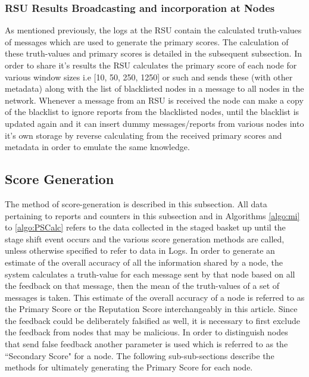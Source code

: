 \documentclass[journal]{IEEEtran}
\begin{document}
\subsubsection{RSU Results Broadcasting and incorporation at Nodes}
As mentioned previously, the logs at the RSU contain the calculated truth-values of messages which are used to generate the primary scores. The calculation of these truth-values and primary scores is detailed in the subsequent subsection.
In order to share it's results the RSU calculates the primary score of each node for various window sizes i.e [10, 50, 250, 1250] or such and sends these (with other metadata) along with the list of blacklisted nodes in a message to all nodes in the network. Whenever a message from an RSU is received the node can make a copy of the blacklist to ignore reports from the blacklisted nodes, until the blacklist is updated again and it can insert dummy messages/reports from various nodes into it's own storage by reverse calculating from the received primary scores and metadata in order to emulate the same knowledge.
\subsection{Score Generation}
\label{sec:PM:ScoreGeneretion}
The method of score-generation is described in this subsection. All data pertaining to reports and counters in this subsection and in Algorithms \ref{algo:mi} to \ref{algo:PSCalc} refers to the data collected in the staged basket up until the stage shift event occurs and the various score generation methods are called, unless otherwise specified to refer to data in Logs. 
In order to generate an estimate of the overall accuracy of all the information shared by a node, the system calculates a truth-value for each message sent by that node based on all the feedback on that message, then the mean of the truth-values of a set of messages is taken. This estimate of the overall accuracy of a node is referred to as the Primary Score or the Reputation Score interchangeably in this article. Since the feedback could be deliberately falsified as well, it is necessary to first exclude the feedback from nodes that may be malicious. In order to distinguish nodes that send false feedback another parameter is used which is referred to as the ``Secondary Score" for a node.
The following sub-sub-sections describe the methods for ultimately generating the Primary Score for each node.
\end{document}
